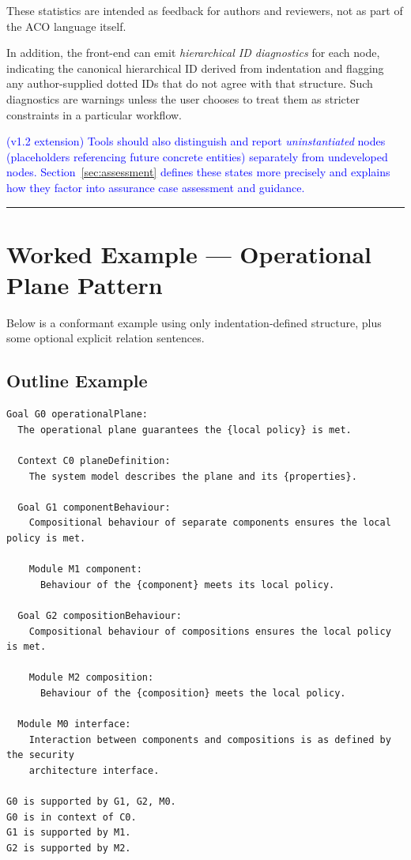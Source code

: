 \documentclass[11pt,twoside,a4paper]{article}
\begin{document}
These statistics are intended as feedback for authors and reviewers, not as part of the ACO language itself.

In addition, the front-end can emit \emph{hierarchical ID diagnostics} for each node, indicating the canonical hierarchical ID derived from indentation and flagging any author-supplied dotted IDs that do not agree with that structure. Such diagnostics are warnings unless the user chooses to treat them as stricter constraints in a particular workflow.

\textcolor{blue}{(v1.2 extension) Tools should also distinguish and report \emph{uninstantiated} nodes (placeholders referencing future concrete entities) separately from undeveloped nodes. Section~\ref{sec:assessment} defines these states more precisely and explains how they factor into assurance case assessment and guidance.}

\bigskip
\hrule
\bigskip

\section{Worked Example --- Operational Plane Pattern}

Below is a conformant example using only indentation-defined structure, plus some optional explicit relation sentences.

\subsection{Outline Example}\label{sec:aco_example}

\begin{verbatim}
Goal G0 operationalPlane:
  The operational plane guarantees the {local policy} is met.

  Context C0 planeDefinition:
    The system model describes the plane and its {properties}.

  Goal G1 componentBehaviour:
    Compositional behaviour of separate components ensures the local policy is met.

    Module M1 component:
      Behaviour of the {component} meets its local policy.

  Goal G2 compositionBehaviour:
    Compositional behaviour of compositions ensures the local policy is met.

    Module M2 composition:
      Behaviour of the {composition} meets the local policy.

  Module M0 interface:
    Interaction between components and compositions is as defined by the security
    architecture interface.

G0 is supported by G1, G2, M0.
G0 is in context of C0.
G1 is supported by M1.
G2 is supported by M2.
\end{verbatim}
\end{document}
